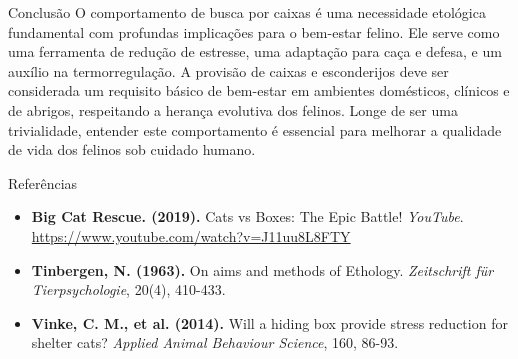 \documentclass[final]{beamer}
\begin{document}
\begin{frame}[t]
\begin{columns}[T]
    \begin{column}{.32\linewidth}
      \begin{block}{Conclusão}
        O comportamento de busca por caixas é uma necessidade etológica fundamental com profundas implicações para o bem-estar felino. Ele serve como uma ferramenta de redução de estresse, uma adaptação para caça e defesa, e um auxílio na termorregulação. A provisão de caixas e esconderijos deve ser considerada um requisito básico de bem-estar em ambientes domésticos, clínicos e de abrigos, respeitando a herança evolutiva dos felinos. Longe de ser uma trivialidade, entender este comportamento é essencial para melhorar a qualidade de vida dos felinos sob cuidado humano.
      \end{block}
      \begin{block}{Referências}
        \begin{itemize}
            \item \footnotesize \textbf{Big Cat Rescue. (2019).} Cats vs Boxes: The Epic Battle! \textit{YouTube}. \url{https://www.youtube.com/watch?v=J11uu8L8FTY}
            \item \footnotesize \textbf{Tinbergen, N. (1963).} On aims and methods of Ethology. \textit{Zeitschrift für Tierpsychologie}, 20(4), 410-433.
            \item \footnotesize \textbf{Vinke, C. M., et al. (2014).} Will a hiding box provide stress reduction for shelter cats? \textit{Applied Animal Behaviour Science}, 160, 86-93.
        \end{itemize}
      \end{block}
    \end{column}

  \end{columns}
\end{frame}
\end{document}
